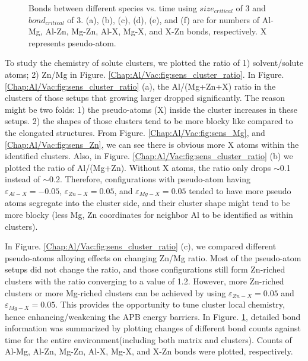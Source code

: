 \begin{figure}[!ht]
\caption[Bonds between different species vs. time using $size_{critical}$ of 3 and $bond_{critical}$ of 3.]{Bonds between different species vs. time using $size_{critical}$ of 3 and $bond_{critical}$ of 3. (a), (b), (c), (d), (e), and (f) are for numbers of Al-Mg, Al-Zn, Mg-Zn, Al-X, Mg-X, and X-Zn bonds, respectively. X represents pseudo-atom.}
\label{Chap:Al/Vac:fig:sens_bond}
\end{figure}
\endgroup


To study the chemistry of solute clusters, we plotted the ratio of 1) solvent/solute atoms; 2) Zn/Mg in Figure. \ref{Chap:Al/Vac:fig:sens_cluster_ratio}. In Figure. \ref{Chap:Al/Vac:fig:sens_cluster_ratio} (a), the Al/(Mg+Zn+X) ratio in the clusters of those setups that growing larger dropped significantly. The reason might be two folds: 1) the pseudo-atoms (X) inside the cluster increases in these setups. 2) the shapes of those clusters tend to be more blocky like compared to the elongated structures. From Figure. \ref{Chap:Al/Vac:fig:sens_Mg}, and \ref{Chap:Al/Vac:fig:sens_Zn}, we can see there is obvious more X atoms within the identified clusters. Also, in Figure. \ref{Chap:Al/Vac:fig:sens_cluster_ratio} (b) we plotted the ratio of Al/(Mg+Zn). Without X atoms, the ratio only drops $\sim$0.1 instead of $\sim$0.2. Therefore, configurations with pseudo-atom having  $\varepsilon_{Al-X} = -0.05$, $\varepsilon_{Zn-X} = 0.05$, and $\varepsilon_{Mg-X} = 0.05$ tended to have more pseudo atoms segregate into the cluster side, and their cluster shape might tend to be more blocky (less Mg, Zn coordinates for neighbor Al to be identified as within clusters).


In Figure. \ref{Chap:Al/Vac:fig:sens_cluster_ratio} (c), we compared different pseudo-atoms alloying effects on changing Zn/Mg ratio. Most of the pseudo-atom setups did not change the ratio, and those configurations still form Zn-riched clusters with the ratio converging to a value of 1.2. However, more Zn-riched clusters or more Mg-riched clusters can be achieved by using $\varepsilon_{Zn-X} = 0.05$ and $\varepsilon_{Mg-X} = 0.05$. This provides the opportunity to tune cluster local chemistry, hence enhancing/weakening the APB energy barriers. In Figure. \ref{Chap:Al/Vac:fig:sens_bond}, detailed bond information was summarized by plotting changes of different bond counts against time for the entire environment(including both matrix and clusters). Counts of Al-Mg, Al-Zn, Mg-Zn, Al-X, Mg-X, and X-Zn bonds were plotted, respectively.



